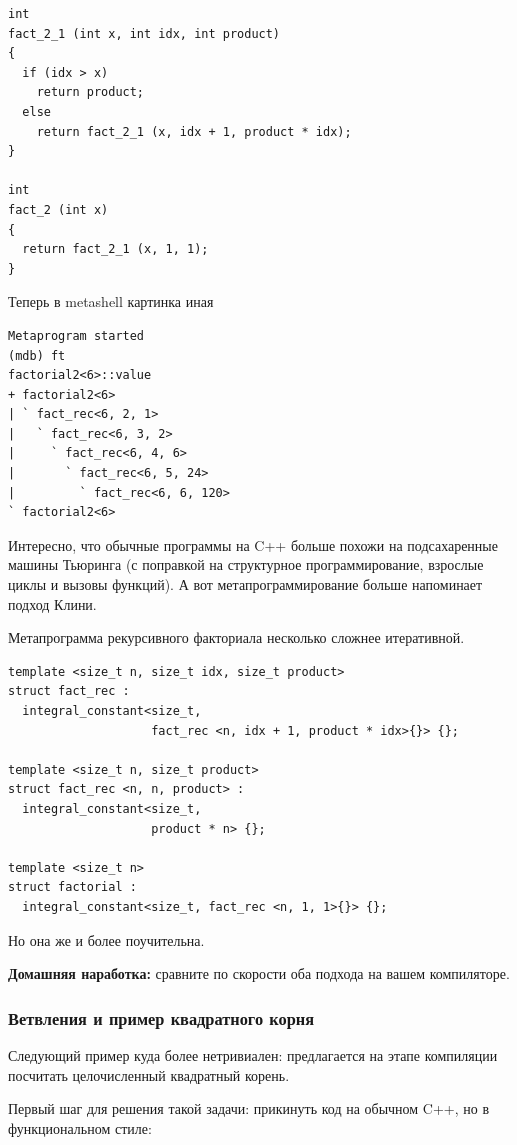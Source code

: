 \documentclass[a4paper,12pt,oneside]{article}
\begin{document}
\begin{lstlisting}
int
fact_2_1 (int x, int idx, int product)
{
  if (idx > x)
    return product;
  else
    return fact_2_1 (x, idx + 1, product * idx);
}

int
fact_2 (int x)
{
  return fact_2_1 (x, 1, 1);
}
\end{lstlisting}

Теперь в metashell картинка иная

\begin{verbatim}
Metaprogram started
(mdb) ft
factorial2<6>::value
+ factorial2<6> 
| ` fact_rec<6, 2, 1> 
|   ` fact_rec<6, 3, 2> 
|     ` fact_rec<6, 4, 6> 
|       ` fact_rec<6, 5, 24> 
|         ` fact_rec<6, 6, 120> 
` factorial2<6> 
\end{verbatim}

Интересно, что обычные программы на C++ больше похожи на подсахаренные машины Тьюринга (с поправкой на структурное программирование, взрослые циклы и вызовы функций). А вот метапрограммирование больше напоминает подход Клини.

Метапрограмма рекурсивного факториала несколько сложнее итеративной.

\begin{lstlisting}
template <size_t n, size_t idx, size_t product> 
struct fact_rec : 
  integral_constant<size_t, 
                    fact_rec <n, idx + 1, product * idx>{}> {};

template <size_t n, size_t product> 
struct fact_rec <n, n, product> : 
  integral_constant<size_t, 
                    product * n> {};

template <size_t n> 
struct factorial : 
  integral_constant<size_t, fact_rec <n, 1, 1>{}> {};
\end{lstlisting}

Но она же и более поучительна.

\textbf{Домашняя наработка:} сравните по скорости оба подхода на вашем компиляторе.

\subsubsection{Ветвления и пример квадратного корня}\label{TemplateIfElse}

Следующий пример куда более нетривиален: предлагается на этапе компиляции посчитать целочисленный квадратный корень.

Первый шаг для решения такой задачи: прикинуть код на обычном C++, но в функциональном стиле:
\end{document}
